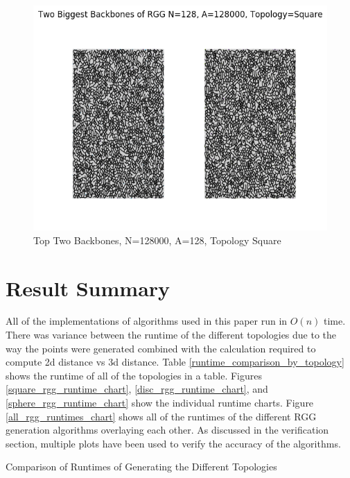 \documentclass{article}
\begin{document}
    \begin{figure}
      \centering
      \label{backbone_128_128000_Square}
      \includegraphics[width=1 \textwidth]{backbone/backbone_128_128000_Square.png}
      \caption{Top Two Backbones, N=128000, A=128, Topology Square}
    \end{figure}

\section{Result Summary}
  All of the implementations of algorithms used in this paper run in $O(n)$ time.
  There was variance between the runtime of the different topologies due to the way the points were generated combined with the calculation required to compute 2d distance vs 3d distance.
  Table \ref{runtime_comparison_by_topology} shows the runtime of all of the topologies in a table.
  Figures \ref{square_rgg_runtime_chart}, \ref{disc_rgg_runtime_chart}, and \ref{sphere_rgg_runtime_chart} show the individual runtime charts.
  Figure \ref{all_rgg_runtimes_chart} shows all of the runtimes of the different RGG generation algorithms overlaying each other.
  As discussed in the verification section, multiple plots have been used to verify the accuracy of the algorithms.

  \begin{table}
    \centering
    \label{runtime_comparison_by_topology}
	  \caption{Comparison of Runtimes of Generating the Different Topologies}
  \end{table}
\end{document}

